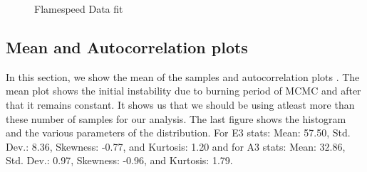  \begin{figure}[H]
  \ContinuedFloat
  \caption{Flamespeed Data fit}
\end{figure}



\subsection{Mean and Autocorrelation plots}

In this section, we show the mean of the samples and autocorrelation plots . The mean plot shows the initial instability due to burning period of MCMC and after that it remains constant. It shows us that we should be using atleast more than these number of samples for our analysis. The last figure shows the histogram and the various parameters of the distribution. For E3 stats: Mean:  57.50, Std. Dev.:  8.36, Skewness:  -0.77, and Kurtosis:  1.20 and for A3 stats: Mean:  32.86, Std. Dev.:  0.97, Skewness:  -0.96, and Kurtosis:  1.79.

